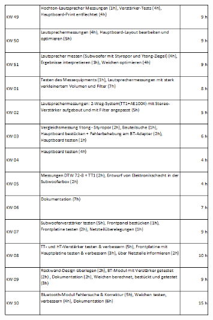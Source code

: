 \begin{figure} [H]
	\centering
	\includegraphics[width=0.8\textwidth]{form/ArbeitsnachweisBointner2von3.png}
\end{figure}
